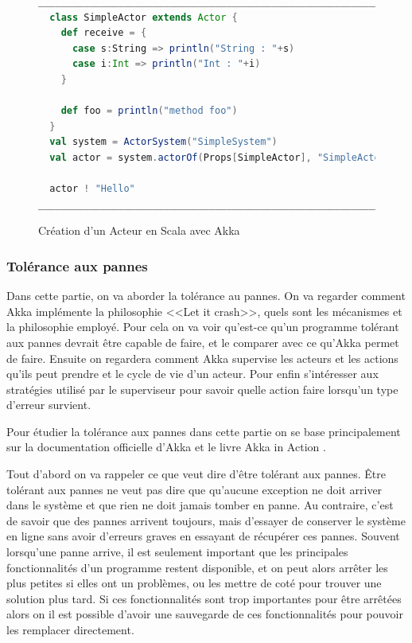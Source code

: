 \documentclass[12pt, a4paper]{article}
\begin{document}
\begin{figure}[h]
\centering
\begin{lstlisting}[language=Scala]
__________________________________________________________________________
  class SimpleActor extends Actor {
    def receive = {
      case s:String => println("String : "+s)
      case i:Int => println("Int : "+i)
    }
    
    def foo = println("method foo")
  }
  val system = ActorSystem("SimpleSystem")
  val actor = system.actorOf(Props[SimpleActor], "SimpleActor")
  
  actor ! "Hello"
___________________________________________________________________________
\end{lstlisting}
\caption{Création d'un Acteur en Scala avec Akka}
\label{act_crea}
\end{figure}

\subsubsection{Tolérance aux pannes}
Dans cette partie, on va aborder la tolérance au pannes. On va regarder comment Akka implémente la philosophie <<Let it crash>>, quels sont les mécanismes et la philosophie employé. Pour cela on va voir qu'est-ce qu'un programme tolérant aux pannes devrait être capable de faire, et le comparer avec ce qu'Akka permet de faire. Ensuite on regardera comment Akka supervise les acteurs et les actions qu'ils peut prendre et le cycle de vie d'un acteur. Pour enfin s’intéresser aux stratégies utilisé par le superviseur pour savoir quelle action faire lorsqu'un type d'erreur survient.
\par Pour étudier la tolérance aux pannes dans cette partie on se base principalement sur la documentation officielle d'Akka \cite{akka} et le livre Akka in Action \cite{roestenburg2015akka}.

\par Tout d'abord on va rappeler ce que veut dire d'être tolérant aux pannes. Être tolérant aux pannes ne veut pas dire que qu'aucune exception ne doit arriver dans le système et que rien ne doit jamais tomber en panne. Au contraire, c'est de savoir que des pannes arrivent toujours, mais d'essayer de conserver le système en ligne sans avoir d'erreurs graves en essayant de récupérer ces pannes. Souvent lorsqu'une panne arrive, il est seulement important que les principales fonctionnalités d'un programme restent disponible, et on peut alors arrêter les plus petites si elles ont un problèmes, ou les mettre de coté pour trouver une solution plus tard. Si ces fonctionnalités sont trop importantes pour être arrêtées alors on il est possible d'avoir une sauvegarde de ces fonctionnalités pour pouvoir les remplacer directement.
\end{document}
